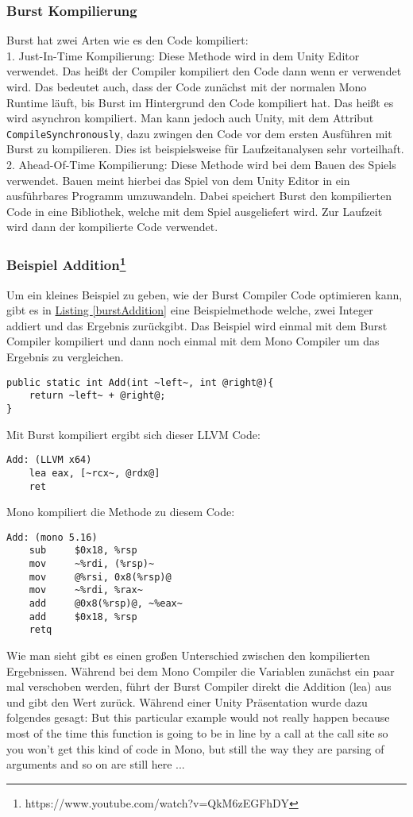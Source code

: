 \subsubsection{Burst Kompilierung}
Burst hat zwei Arten wie es den Code kompiliert:\\
1. Just-In-Time Kompilierung: Diese Methode wird in dem Unity Editor verwendet. Das heißt der Compiler kompiliert den Code dann wenn er verwendet wird. Das bedeutet auch, dass der Code zunächst mit der normalen Mono Runtime läuft, bis Burst im Hintergrund den Code kompiliert hat. Das heißt es wird asynchron kompiliert. Man kann jedoch auch Unity, mit dem Attribut \texttt{CompileSynchronously}, dazu zwingen den Code vor dem ersten Ausführen mit Burst zu kompilieren. Dies ist beispielsweise für Laufzeitanalysen sehr vorteilhaft.\\
2. Ahead-Of-Time Kompilierung: Diese Methode wird bei dem Bauen des Spiels verwendet. Bauen meint hierbei das Spiel von dem Unity Editor in ein ausführbares Programm umzuwandeln. Dabei speichert Burst den kompilierten Code in eine Bibliothek, welche mit dem Spiel ausgeliefert wird. Zur Laufzeit wird dann der kompilierte Code verwendet.
\subsubsection{Beispiel Addition\footnote{https://www.youtube.com/watch?v=QkM6zEGFhDY}}
Um ein kleines Beispiel zu geben, wie der Burst Compiler Code optimieren kann, gibt es in \hyperref[burstAddition]{Listing \ref*{burstAddition}} eine Beispielmethode welche, zwei Integer addiert und das Ergebnis zurückgibt. Das Beispiel wird einmal mit dem Burst Compiler kompiliert und dann noch einmal mit dem Mono Compiler um das Ergebnis zu vergleichen.
\begin{lstlisting}[style=code, caption={Beispiel Addition Burst}, label = burstAddition]
public static int Add(int ~left~, int @right@){
	return ~left~ + @right@;
}
\end{lstlisting}
Mit Burst kompiliert ergibt sich dieser LLVM Code:
\begin{lstlisting}[style=code, caption={Addition Burst compiled}]
Add: (LLVM x64)
	lea eax, [~rcx~, @rdx@]
	ret
\end{lstlisting}
Mono kompiliert die Methode zu diesem Code:
\begin{lstlisting}[style=code, caption={Addition Mono compiled}]
Add: (mono 5.16)
	sub		$0x18, %rsp
	mov		~%rdi, (%rsp)~
	mov 	@%rsi, 0x8(%rsp)@
	mov 	~%rdi, %rax~
	add 	@0x8(%rsp)@, ~%eax~
	add 	$0x18, %rsp
	retq
\end{lstlisting}
Wie man sieht gibt es einen großen Unterschied zwischen den kompilierten Ergebnissen. Während bei dem Mono Compiler die Variablen zunächst ein paar mal verschoben werden, führt der Burst Compiler direkt die Addition (lea) aus und gibt den Wert zurück. Während einer Unity Präsentation wurde dazu folgendes gesagt: \glqq But this particular example would not really happen because most of the time this function is going to be in line by a call at the call site so you won't get this kind of code in Mono, but still the way they are parsing of arguments and so on are still here ...\grqq{}\cite{Burst-Unite_LA}